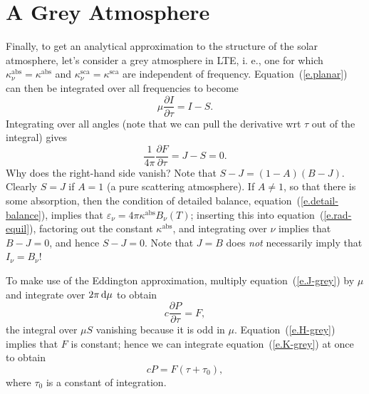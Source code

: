 \section[Grey Atmosphere]{A Grey Atmosphere}

Finally, to get an analytical approximation to the structure of the solar atmosphere, let's consider a grey atmosphere in LTE, i. e., one for which $\kappa_{\nu}^{\mathrm{abs}} = \kappa^{\mathrm{abs}}$ and $\kappa_{\nu}^{\mathrm{sca}} = \kappa^{\mathrm{sca}}$ are independent of frequency. Equation~(\ref{e.planar}) can then be integrated over all frequencies to become
\begin{equation}\label{e.J-grey}
\mu\frac{\partial I}{\partial\tau} = I-S.
\end{equation}
Integrating over all angles (note that we can pull the derivative wrt $\tau$ out of the integral) gives
\begin{equation}\label{e.H-grey}
\frac{1}{4\pi}\frac{\partial F}{\partial\tau} = J - S = 0.
\end{equation}
Why does the right-hand side vanish? Note that $S-J = (1-A)(B-J)$.  Clearly $S = J$ if $A = 1$ (a pure scattering atmosphere).  If $A \ne 1$, so that there is some absorption, then the condition of detailed balance, equation~(\ref{e.detail-balance}), implies that $\varepsilon_{\nu} = 4\pi\kappa^{\mathrm{abs}}B_{\nu}(T)$; inserting this into equation~(\ref{e.rad-equil}), factoring out the constant $\kappa^{\mathrm{abs}}$, and integrating over $\nu$ implies that $B - J = 0$, and hence $S - J = 0$. Note that $J = B$ does \emph{not} necessarily imply that $I_{\nu} = B_{\nu}$!

To make use of the Eddington approximation, multiply equation~(\ref{e.J-grey}) by $\mu$ and integrate over $2\pi\,\mathrm{d}\mu$ to obtain
\begin{equation}\label{e.K-grey}
c\frac{\partial P}{\partial\tau} = F,
\end{equation}
the integral over $\mu S$ vanishing because it is odd in $\mu$. Equation~(\ref{e.H-grey}) implies that $F$ is constant; hence we can integrate equation~(\ref{e.K-grey}) at once to obtain
\begin{equation}\label{e.KH}
cP = F(\tau + \tau_{0}),
\end{equation}
where $\tau_{0}$ is a constant of integration.

